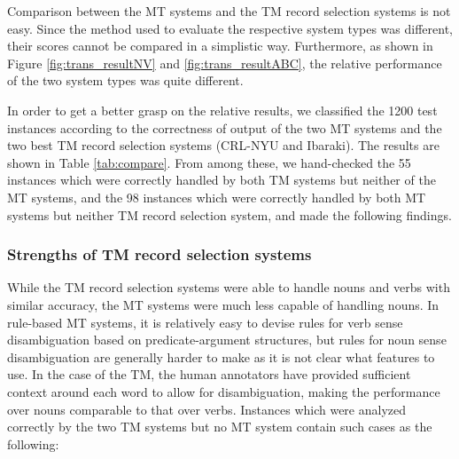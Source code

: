 Comparison between the MT systems and the TM record selection systems is
not easy.  Since the method used to evaluate the respective system types
was different, their scores cannot be compared in a simplistic way.
Furthermore, as shown in Figure \ref{fig:trans_resultNV} and
\ref{fig:trans_resultABC}, the relative performance of the two system
types was quite different.

In order to get a better grasp on the relative results, we classified
the 1200 test instances according to the correctness of output of the
two MT systems and the two best TM record selection systems (CRL-NYU and
Ibaraki).  The results are shown in Table \ref{tab:compare}.  From among
these, we hand-checked the 55 instances which were correctly handled by
both TM systems but neither of the MT systems, and the 98 instances
which were correctly handled by both MT systems but neither TM record
selection system, and made the following findings.



\subsubsection{Strengths of TM record selection systems}

While the TM record selection systems were able to handle nouns and
verbs with similar accuracy, the MT systems were much less capable of
handling nouns.  In rule-based MT systems, it is relatively easy to
devise rules for verb sense disambiguation based on predicate-argument
structures, but rules for noun sense disambiguation are generally harder
to make as it is not clear what features to use.  In the case of the TM,
the human annotators have provided sufficient context around each word
to allow for disambiguation, making the performance over nouns
comparable to that over verbs.  Instances which were analyzed correctly
by the two TM systems but no MT system contain such cases as the
following:

